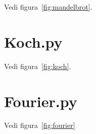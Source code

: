 Vedi figura~\ref{fig:mandelbrot}.
\label{code:Mandelbrot}


\section{Koch.py}

Vedi figura~\ref{fig:koch}.
\label{code:Koch}


\section{Fourier.py}

Vedi figura~\ref{fig:fourier}
\label{code:Fourier}

